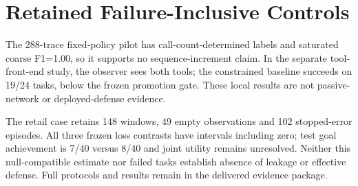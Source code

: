 \section{Retained Failure-Inclusive Controls}
\label{app:pilot}\label{app:observer-study}\label{app:fixed-luna}
The 288-trace fixed-policy pilot has call-count-determined labels and saturated coarse F1=1.00, so it supports no sequence-increment claim. In the separate tool-front-end study, the observer sees both tools; the constrained baseline succeeds on 19/24 tasks, below the frozen promotion gate. These local results are not passive-network or deployed-defense evidence.

The retail case retains 148 windows, 49 empty observations and 102 stopped-error episodes. All three frozen loss contrasts have intervals including zero; test goal achievement is 7/40 versus 8/40 and joint utility remains unresolved. Neither this null-compatible estimate nor failed tasks establish absence of leakage or effective defense. Full protocols and results remain in the delivered evidence package.
